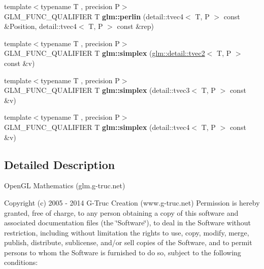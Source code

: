 \begin{DoxyCompactItemize}
\item 
\hypertarget{namespaceglm_aae37c0aec171d76dc3ca061fe4ee8a9c}{{\footnotesize template$<$typename T , precision P$>$ }\\G\-L\-M\-\_\-\-F\-U\-N\-C\-\_\-\-Q\-U\-A\-L\-I\-F\-I\-E\-R T {\bfseries glm\-::perlin} (detail\-::tvec4$<$ T, P $>$ const \&Position, detail\-::tvec4$<$ T, P $>$ const \&rep)}\label{namespaceglm_aae37c0aec171d76dc3ca061fe4ee8a9c}

\item 
\hypertarget{namespaceglm_abdfacc8dd98029ebf09c0a4a1ed505f5}{{\footnotesize template$<$typename T , precision P$>$ }\\G\-L\-M\-\_\-\-F\-U\-N\-C\-\_\-\-Q\-U\-A\-L\-I\-F\-I\-E\-R T {\bfseries glm\-::simplex} (\hyperlink{structglm_1_1detail_1_1tvec2}{glm\-::detail\-::tvec2}$<$ T, P $>$ const \&v)}\label{namespaceglm_abdfacc8dd98029ebf09c0a4a1ed505f5}

\item 
\hypertarget{namespaceglm_aa95d7bc123a0a077dc7f015333e2d674}{{\footnotesize template$<$typename T , precision P$>$ }\\G\-L\-M\-\_\-\-F\-U\-N\-C\-\_\-\-Q\-U\-A\-L\-I\-F\-I\-E\-R T {\bfseries glm\-::simplex} (detail\-::tvec3$<$ T, P $>$ const \&v)}\label{namespaceglm_aa95d7bc123a0a077dc7f015333e2d674}

\item 
\hypertarget{namespaceglm_aadad60578e53c3af96e0a078cc4ad462}{{\footnotesize template$<$typename T , precision P$>$ }\\G\-L\-M\-\_\-\-F\-U\-N\-C\-\_\-\-Q\-U\-A\-L\-I\-F\-I\-E\-R T {\bfseries glm\-::simplex} (detail\-::tvec4$<$ T, P $>$ const \&v)}\label{namespaceglm_aadad60578e53c3af96e0a078cc4ad462}

\end{DoxyCompactItemize}


\subsection{Detailed Description}
Open\-G\-L Mathematics (glm.\-g-\/truc.\-net)

Copyright (c) 2005 -\/ 2014 G-\/\-Truc Creation (www.\-g-\/truc.\-net) Permission is hereby granted, free of charge, to any person obtaining a copy of this software and associated documentation files (the \char`\"{}\-Software\char`\"{}), to deal in the Software without restriction, including without limitation the rights to use, copy, modify, merge, publish, distribute, sublicense, and/or sell copies of the Software, and to permit persons to whom the Software is furnished to do so, subject to the following conditions\-:

